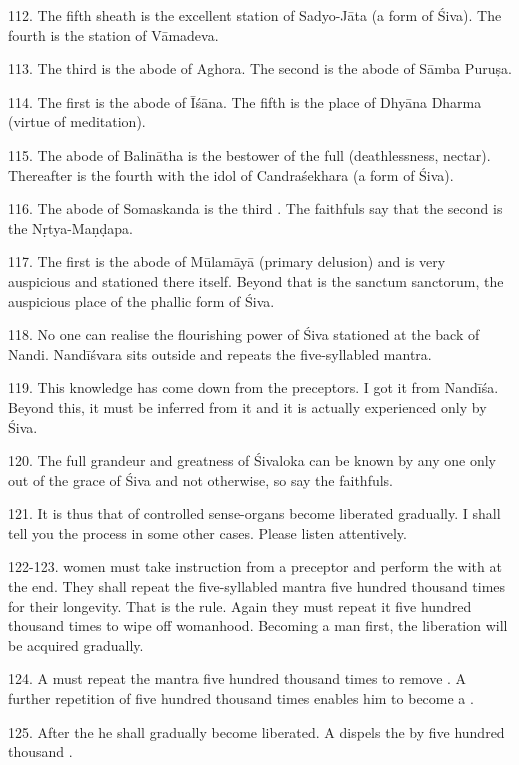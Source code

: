 112. The fifth sheath is the excellent station of Sadyo-Jāta (a form of Śiva).
The fourth is the station of Vāmadeva.

113. The third is the abode of Aghora. The second is the abode of Sāmba Puruṣa.

114. The first is the abode of Īśāna. The fifth is the place of Dhyāna Dharma
(virtue of meditation).

115. The abode of Balinātha is the bestower of the full  (deathlessness,
nectar). Thereafter is the fourth  with the idol of Candraśekhara
(a form of Śiva).

116. The abode of Somaskanda is the third . The faithfuls say that
the second  is the Nṛtya-Maṇḍapa.

117. The first  is the abode of Mūlamāyā (primary delusion) and is
very auspicious and stationed there itself. Beyond that is the sanctum sanctorum,
the auspicious place of the phallic form of Śiva.

118. No one can realise the flourishing power of Śiva stationed at the back of
Nandi. Nandīśvara sits outside and repeats the five-syllabled mantra.

119. This knowledge has come down from the preceptors. I got it from Nandīśa.
Beyond this, it must be inferred from it and it is actually experienced only by
Śiva.

120. The full grandeur and greatness of Śivaloka can be known by any one only
out of the grace of Śiva and not otherwise, so say the faithfuls.

121. It is thus that  of controlled sense-organs become liberated
gradually. I shall tell you the process in some other cases. Please listen
attentively.

122-123.  women must take instruction from a preceptor and perform
the  with  at the end. They shall repeat the five-syllabled
mantra five hundred thousand times for their longevity. That is the rule. Again
they must repeat it five hundred thousand times to wipe off womanhood. Becoming
a man first, the liberation will be acquired gradually.

124. A  must repeat the mantra five hundred thousand times to
remove . A further repetition of five hundred thousand times
enables him to become a .

125. After the  he shall gradually become liberated.
A  dispels the  by five hundred thousand .

